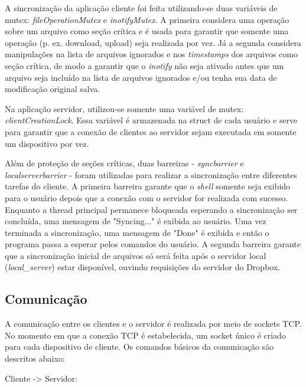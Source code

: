 \documentclass[a4paper]{article}
\begin{document}
A sincronização da aplicação cliente foi feita utilizando-se duas variáveis de mutex: \textit{fileOperationMutex} e \textit{inotifyMutex}. A primeira considera uma operação sobre um arquivo como seção crítica e é usada para garantir que somente uma operação (p. ex. download, upload) seja realizada por vez. Já a segunda considera manipulações na lista de arquivos ignorados e nos \textit{timestamps} dos arquivos como seção crítica, de modo a garantir que o \textit{inotify} não seja ativado antes que um arquivo seja incluído na lista de arquivos ignorados e/ou tenha sua data de modificação original salva.

Na aplicação servidor, utilizou-se somente uma variável de mutex: \textit{clientCreationLock}. Essa variável é armazenada na struct de cada usuário e serve para garantir que a conexão de clientes ao servidor sejam executada em somente um dispositivo por vez.

Além de proteção de seções críticas, duas barreiras - \textit{syncbarrier} e \textit{localserverbarrier} - foram utilizadas para realizar a sincronização entre diferentes tarefas do cliente. A primeira barreira garante que o \textit{shell} somente seja exibido para o usuário depois que a conexão com o servidor for realizada com sucesso. Enquanto a thread principal permanece bloqueada esperando a sincronização ser concluída, uma mensagem de "Syncing..." é exibida ao usuário. Uma vez terminada a sincronização, uma mensagem de "Done" é exibida e então o programa passa a esperar pelos comandos do usuário.
A segunda barreira garante que a sincronização inicial de arquivos só será feita após o servidor local (\textit{local\_server}) estar disponível, ouvindo requisições do servidor do Dropbox.

\subsection{Comunicação}
A comunicação entre os clientes e o servidor é realizada por meio de sockets TCP. No momento em que a conexão TCP é estabelecida, um socket único é criado para cada dispositivo de cliente. Os comandos básicos da comunicação são descritos abaixo:


Cliente -> Servidor:
\end{document}
